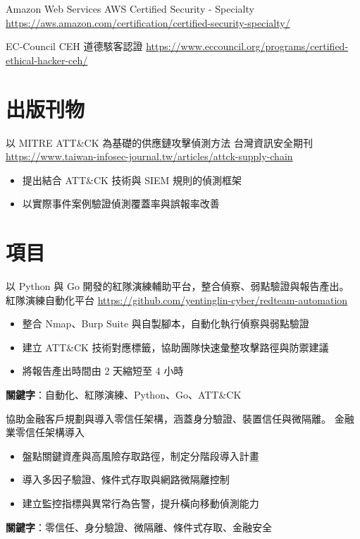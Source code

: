 \documentclass[a4paper, serif, 10pt]{moderncv}
\begin{document}
        {Amazon Web Services}
        {AWS Certified Security - Specialty}
        {\url{https://aws.amazon.com/certification/certified-security-specialty/}}
        {}
        {}

        {EC-Council}
        {CEH 道德駭客認證}
        {\url{https://www.eccouncil.org/programs/certified-ethical-hacker-ceh/}}
        {}
        {}
\section{出版刊物}

        {以 MITRE ATT\&CK 為基礎的供應鏈攻擊偵測方法}
        {台灣資訊安全期刊}
        {\url{https://www.taiwan-infosec-journal.tw/articles/attck-supply-chain}}
        {}
        {\begin{itemize}
\item 提出結合 ATT\&CK 技術與 SIEM 規則的偵測框架
\item 以實際事件案例驗證偵測覆蓋率與誤報率改善
\end{itemize}}
\section{項目}

        {以 Python 與 Go 開發的紅隊演練輔助平台，整合偵察、弱點驗證與報告產出。}
        {紅隊演練自動化平台}
        {\url{https://github.com/yentinglin-cyber/redteam-automation}}
        {}
        {\begin{itemize}
\item 整合 Nmap、Burp Suite 與自製腳本，自動化執行偵察與弱點驗證
\item 建立 ATT\&CK 技術對應標籤，協助團隊快速彙整攻擊路徑與防禦建議
\item 將報告產出時間由 2 天縮短至 4 小時
\end{itemize}
\textbf{關鍵字}：自動化、紅隊演練、Python、Go、ATT\&CK}

        {協助金融客戶規劃與導入零信任架構，涵蓋身分驗證、裝置信任與微隔離。}
        {金融業零信任架構導入}
        {}
        {}
        {\begin{itemize}
\item 盤點關鍵資產與高風險存取路徑，制定分階段導入計畫
\item 導入多因子驗證、條件式存取與網路微隔離控制
\item 建立監控指標與異常行為告警，提升橫向移動偵測能力
\end{itemize}
\textbf{關鍵字}：零信任、身分驗證、微隔離、條件式存取、金融安全}
\end{document}
